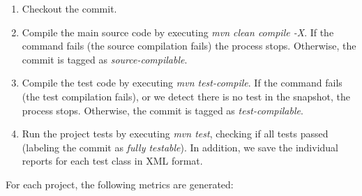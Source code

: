 \begin{enumerate}
    \item Checkout the commit.
    \item Compile the main source code by executing \textit{mvn clean compile -X}. If the command fails (the source compilation fails) the process stops. Otherwise, the commit is tagged as \textit{source-compilable}.
    \item Compile the test code by executing \textit{mvn test-compile}. If the command fails (the test compilation fails), or we detect there is no test in the snapshot, the process stops. Otherwise, the commit is tagged as \textit{test-compilable}.
    \item Run the project tests by executing \textit{mvn test}, checking if all tests passed (labeling the commit as \textit{fully testable}).
    In addition, we save the individual reports for each test class in XML format.
\end{enumerate}



For each project, the following metrics are generated:

